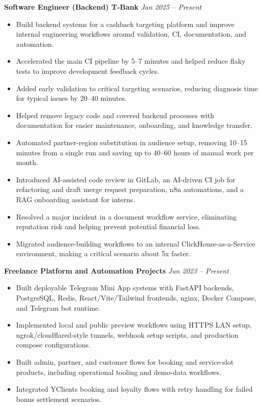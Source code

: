 \documentclass[10pt,a4paper]{article}
\begin{document}
\textbf{Software Engineer (Backend) \textbar{} T-Bank} \hfill \textit{Jan 2025 -- Present}
\begin{itemize}
  \item Build backend systems for a cashback targeting platform and improve internal engineering workflows around validation, CI, documentation, and automation.
  \item Accelerated the main CI pipeline by 5--7 minutes and helped reduce flaky tests to improve development feedback cycles.
  \item Added early validation to critical targeting scenarios, reducing diagnosis time for typical issues by 20--40 minutes.
  \item Helped remove legacy code and covered backend processes with documentation for easier maintenance, onboarding, and knowledge transfer.
  \item Automated partner-region substitution in audience setup, removing 10--15 minutes from a single run and saving up to 40--60 hours of manual work per month.
  \item Introduced AI-assisted code review in GitLab, an AI-driven CI job for refactoring and draft merge request preparation, n8n automations, and a RAG onboarding assistant for interns.
  \item Resolved a major incident in a document workflow service, eliminating reputation risk and helping prevent potential financial loss.
  \item Migrated audience-building workflows to an internal ClickHouse-as-a-Service environment, making a critical scenario about 5x faster.
\end{itemize}

\textbf{Freelance Platform and Automation Projects} \hfill \textit{Jun 2023 -- Present}
\begin{itemize}
  \item Built deployable Telegram Mini App systems with FastAPI backends, PostgreSQL, Redis, React/Vite/Tailwind frontends, nginx, Docker Compose, and Telegram bot runtime.
  \item Implemented local and public preview workflows using HTTPS LAN setup, ngrok/cloudflared-style tunnels, webhook setup scripts, and production compose configurations.
  \item Built admin, partner, and customer flows for booking and service-slot products, including operational tooling and demo-data workflows.
  \item Integrated YClients booking and loyalty flows with retry handling for failed bonus settlement scenarios.
\end{itemize}
\end{document}
